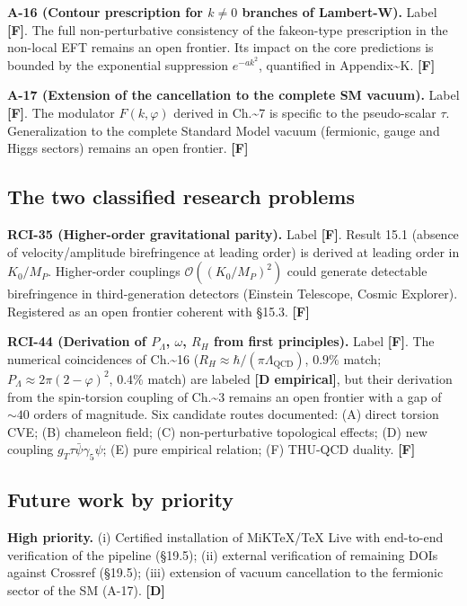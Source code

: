 ﻿\documentclass[11pt,letterpaper]{article}
\begin{document}
\textbf{A-16 (Contour prescription for $k \neq 0$ branches of Lambert-W).} Label \textbf{[F]}. The full non-perturbative consistency of the fakeon-type prescription in the non-local EFT remains an open frontier. Its impact on the core predictions is bounded by the exponential suppression $e^{-ak^2}$, quantified in Appendix\textasciitilde{}K. \textbf{[F]}

\textbf{A-17 (Extension of the cancellation to the complete SM vacuum).} Label \textbf{[F]}. The modulator $F(k, \varphi)$ derived in Ch.\textasciitilde{}7 is specific to the pseudo-scalar $\tau$. Generalization to the complete Standard Model vacuum (fermionic, gauge and Higgs sectors) remains an open frontier. \textbf{[F]}
\subsection{The two classified research problems}
\textbf{RCI-35 (Higher-order gravitational parity).} Label \textbf{[F]}. Result 15.1 (absence of velocity/amplitude birefringence at leading order) is derived at leading order in $K_0/M_P$. Higher-order couplings $\mathcal{O}((K_0/M_P)^2)$ could generate detectable birefringence in third-generation detectors (Einstein Telescope, Cosmic Explorer). Registered as an open frontier coherent with §15.3. \textbf{[F]}

\textbf{RCI-44 (Derivation of $P_\Lambda$, $\omega$, $R_H$ from first principles).} Label \textbf{[F]}. The numerical coincidences of Ch.\textasciitilde{}16 ($R_H \approx \hbar/(\pi\Lambda_{\text{QCD}})$, $0{.}9\%$ match; $P_\Lambda \approx 2\pi(2-\varphi)^2$, $0{.}4\%$ match) are labeled \textbf{[D empirical]}, but their derivation from the spin-torsion coupling of Ch.\textasciitilde{}3 remains an open frontier with a gap of $\sim 40$ orders of magnitude. Six candidate routes documented: (A) direct torsion CVE; (B) chameleon field; (C) non-perturbative topological effects; (D) new coupling $g_T \tau\bar{\psi}\gamma_5\psi$; (E) pure empirical relation; (F) THU-QCD duality. \textbf{[F]}
\subsection{Future work by priority}
\textbf{High priority.} (i) Certified installation of MiKTeX/TeX Live with end-to-end verification of the pipeline (§19.5); (ii) external verification of remaining DOIs against Crossref (§19.5); (iii) extension of vacuum cancellation to the fermionic sector of the SM (A-17). \textbf{[D]}
\end{document}
